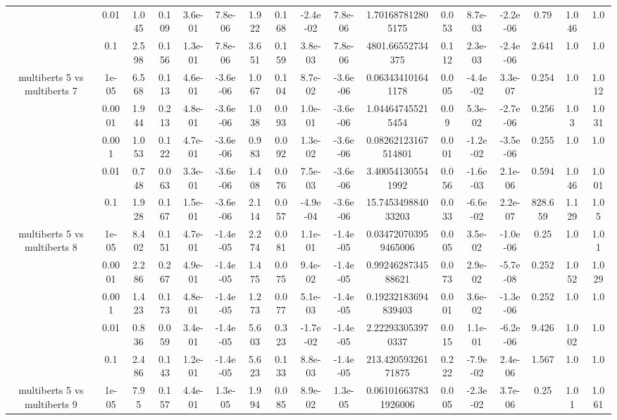 \begin{tabular}{|c|c|c|c|c|c|c|c|c|c|c|c|c|c|c|c|c|}
 & 0.01 & 1.045 & 0.109 & 3.6e-01 & 7.8e-06 & 1.922 & 0.168 & -2.4e-02 & 7.8e-06 & 1.701687812805175 & 0.053 & 8.7e-03 & -2.2e-06 & 0.79 & 1.046 & 1.0 \\
 & 0.1 & 2.598 & 0.156 & 1.3e-01 & 7.8e-06 & 3.651 & 0.159 & 3.8e-03 & 7.8e-06 & 4801.66552734375 & 0.112 & 2.3e-03 & -2.4e-06 & 2.641 & 1.0 & 1.0 \\
\hline
\multirow{5}{*}{multiberts 5 vs multiberts 7} & 1e-05 & 6.568 & 0.113 & 4.6e-01 & -3.6e-06 & 1.067 & 0.104 & 8.7e-02 & -3.6e-06 & 0.063434101641178 & 0.005 & -4.4e-02 & 3.3e-07 & 0.254 & 1.0 & 1.012 \\
 & 0.0001 & 1.944 & 0.213 & 4.8e-01 & -3.6e-06 & 1.038 & 0.093 & 1.0e-01 & -3.6e-06 & 1.044647455215454 & 0.09 & 5.3e-02 & -2.7e-06 & 0.256 & 1.03 & 1.031 \\
 & 0.001 & 1.053 & 0.122 & 4.7e-01 & -3.6e-06 & 0.983 & 0.092 & 1.3e-02 & -3.6e-06 & 0.08262123167514801 & 0.001 & -1.2e-02 & -3.5e-06 & 0.255 & 1.0 & 1.0 \\
 & 0.01 & 0.748 & 0.063 & 3.3e-01 & -3.6e-06 & 1.408 & 0.076 & 7.5e-03 & -3.6e-06 & 3.400541305541992 & 0.056 & -1.6e-03 & 2.1e-06 & 0.594 & 1.046 & 1.001 \\
 & 0.1 & 1.928 & 0.167 & 1.5e-01 & -3.6e-06 & 2.114 & 0.057 & -4.9e-04 & -3.6e-06 & 15.745349884033203 & 0.033 & -6.6e-02 & 2.2e-07 & 828.659 & 1.129 & 1.05 \\
\hline
\multirow{5}{*}{multiberts 5 vs multiberts 8} & 1e-05 & 8.402 & 0.151 & 4.7e-01 & -1.4e-05 & 2.274 & 0.081 & 1.1e-01 & -1.4e-05 & 0.034720703959465006 & 0.005 & 3.5e-02 & -1.0e-06 & 0.25 & 1.0 & 1.01 \\
 & 0.0001 & 2.286 & 0.267 & 4.9e-01 & -1.4e-05 & 1.475 & 0.075 & 9.4e-02 & -1.4e-05 & 0.9924628734588621 & 0.073 & 2.9e-02 & -5.7e-08 & 0.252 & 1.052 & 1.029 \\
 & 0.001 & 1.423 & 0.173 & 4.8e-01 & -1.4e-05 & 1.273 & 0.077 & 5.1e-03 & -1.4e-05 & 0.19232183694839403 & 0.001 & 3.6e-02 & -1.3e-06 & 0.252 & 1.0 & 1.0 \\
 & 0.01 & 0.836 & 0.059 & 3.4e-01 & -1.4e-05 & 5.603 & 0.323 & -1.7e-02 & -1.4e-05 & 2.222933053970337 & 0.015 & 1.1e-01 & -6.2e-06 & 9.426 & 1.002 & 1.0 \\
 & 0.1 & 2.486 & 0.143 & 1.2e-01 & -1.4e-05 & 5.623 & 0.133 & 8.8e-03 & -1.4e-05 & 213.42059326171875 & 0.222 & -7.9e-02 & 2.4e-06 & 1.567 & 1.0 & 1.0 \\
\hline
\multirow{5}{*}{multiberts 5 vs multiberts 9} & 1e-05 & 7.95 & 0.157 & 4.4e-01 & 1.3e-05 & 1.994 & 0.085 & 8.9e-02 & 1.3e-05 & 0.061016637831926006 & 0.005 & -2.3e-02 & 3.7e-06 & 0.25 & 1.01 & 1.061 \\

\end{tabular}
